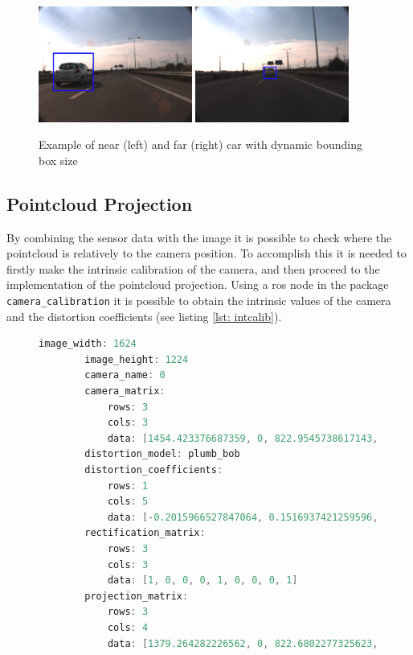 \begin{figure}[htp]
	
	\centering
	\includegraphics[width=0.45\textwidth]{caplabel/imgs/boxds1.png}
	\includegraphics[width=0.45\textwidth]{caplabel/imgs/boxds2.png}
	
	\caption{Example of near (left) and far (right) car with dynamic bounding box size}
	\label{fig:basket}
	
\end{figure}

\subsection{Pointcloud Projection}

By combining the sensor data with the image it is possible to check where the pointcloud is relatively to the camera position. To accomplish this it is needed to firstly make the intrinsic calibration of the camera, and then proceed to the implementation of the pointcloud projection. Using a \gls{ros} node in the package \texttt{camera\_calibration} it is possible to obtain the intrinsic values of the camera and the distortion coefficients (see listing \ref{lst: intcalib}).

\begin{figure}
	\begin{center}
		\begin{lstlisting}[caption={Intrinsic Calibration Result}, language=c++, label={lst: intcalib}]
		image_width: 1624
		image_height: 1224
		camera_name: 0
		camera_matrix:
			rows: 3
			cols: 3
			data: [1454.423376687359, 0, 822.9545738617143, 0, 1458.005828758985, 590.5652711935882, 0, 0, 1]
		distortion_model: plumb_bob
		distortion_coefficients:
			rows: 1
			cols: 5
			data: [-0.2015966527847064, 0.1516937421259596, -0.0009340794635090795, -0.0006787308984611241, 0]
		rectification_matrix:
			rows: 3
			cols: 3
			data: [1, 0, 0, 0, 1, 0, 0, 0, 1]
		projection_matrix:
			rows: 3
			cols: 4
			data: [1379.264282226562, 0, 822.6802277325623, 0, 0, 1410.231689453125, 588.4764252277164, 0, 0, 0, 1, 0]\end{lstlisting}
	\end{center}
\end{figure}

